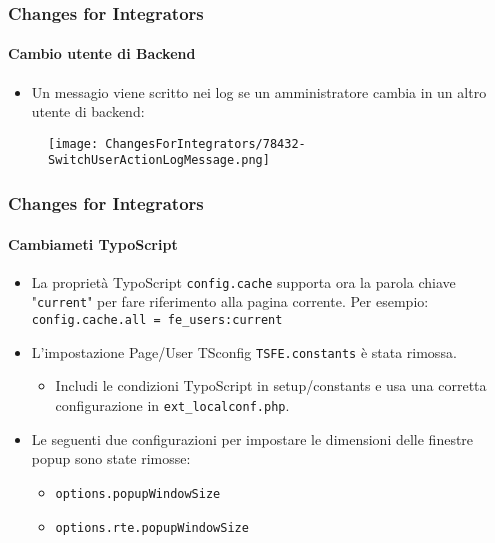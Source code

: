 
\begin{frame}[fragile]
	\frametitle{Changes for Integrators}
	\framesubtitle{Cambio utente di Backend}

	\begin{itemize}
		\item Un messagio viene scritto nei log se un amministratore cambia in un altro utente di backend:
	\end{itemize}

	\begin{figure}
		\texttt{[image: ChangesForIntegrators/78432-SwitchUserActionLogMessage.png]}
	\end{figure}

\end{frame}


\begin{frame}[fragile]
	\frametitle{Changes for Integrators}
	\framesubtitle{Cambiameti TypoScript}

	\begin{itemize}
		\item La proprietà TypoScript \texttt{config.cache} supporta ora la parola chiave
			"\texttt{current}" per fare riferimento alla pagina corrente. Per esempio:\newline
			\smaller\texttt{config.cache.all = fe\_users:current}\normalsize

		\item L'impostazione Page/User TSconfig \texttt{TSFE.constants} è stata rimossa.

			\begin{itemize}\smaller
				\item[\ding{228}] Includi le condizioni TypoScript in setup/constants e usa una corretta configurazione in \texttt{ext\_localconf.php}.
			\end{itemize}

		\item Le seguenti due configurazioni per impostare le dimensioni delle finestre popup sono state rimosse:

			\begin{itemize}
				\item \texttt{options.popupWindowSize}
				\item \texttt{options.rte.popupWindowSize}
			\end{itemize}

	\end{itemize}

\end{frame}

